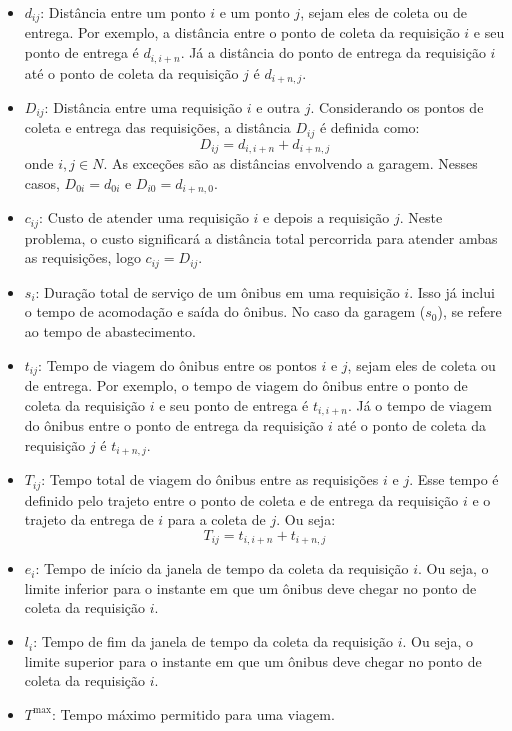 \documentclass[12pt, a4paper]{article}
\begin{document}
\begin{itemize}
    \item $d_{ij}$: Distância entre um ponto $i$ e um ponto $j$, sejam eles de coleta ou de entrega. Por exemplo, a distância entre o ponto de coleta da requisição $i$ e seu ponto de entrega é $d_{i, i+n}$. Já a distância do ponto de entrega da requisição $i$ até o ponto de coleta da requisição $j$ é $d_{i+n, j}$.
    \item $D_{ij}$: Distância entre uma requisição $i$ e outra $j$. Considerando os pontos de coleta e entrega das requisições, a distância $D_{ij}$ é definida como: $$ D_{ij} = d_{i, i+n} + d_{i+n, j} $$ onde $i, j \in N$. As exceções são as distâncias envolvendo a garagem. Nesses casos, $D_{0i} = d_{0i}$ e $D_{i0} = d_{i+n, 0}$.
    \item $c_{ij}$: Custo de atender uma requisição $i$ e depois a requisição $j$. Neste problema, o custo significará a distância total percorrida para atender ambas as requisições, logo $c_{ij} = D_{ij}$.
    \item $s_i$: Duração total de serviço de um ônibus em uma requisição $i$. Isso já inclui o tempo de acomodação e saída do ônibus. No caso da garagem ($s_0$), se refere ao tempo de abastecimento.
    \item $t_{ij}$: Tempo de viagem do ônibus entre os pontos $i$ e $j$, sejam eles de coleta ou de entrega. Por exemplo, o tempo de viagem do ônibus entre o ponto de coleta da requisição $i$ e seu ponto de entrega é $t_{i, i+n}$. Já o tempo de viagem do ônibus entre o ponto de entrega da requisição $i$ até o ponto de coleta da requisição $j$ é $t_{i+n, j}$.
    \item $T_{ij}$: Tempo total de viagem do ônibus entre as requisições $i$ e $j$. Esse tempo é definido pelo trajeto entre o ponto de coleta e de entrega da requisição $i$ e o trajeto da entrega de $i$ para a coleta de $j$. Ou seja: $$T_{ij} = t_{i, i+n} + t_{i+n, j}$$
    \item $e_i$: Tempo de início da janela de tempo da coleta da requisição $i$. Ou seja, o limite inferior para o instante em que um ônibus deve chegar no ponto de coleta da requisição $i$.
    \item $l_i$: Tempo de fim da janela de tempo da coleta da requisição $i$. Ou seja, o limite superior para o instante em que um ônibus deve chegar no ponto de coleta da requisição $i$.
    \item $T^{\max}$: Tempo máximo permitido para uma viagem.
\end{itemize}
\end{document}
